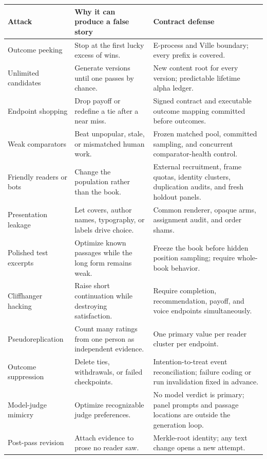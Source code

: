 \documentclass[11pt]{article}
\theoremstyle{remark}
\begin{document}
\begin{center}
\footnotesize
\begin{tabular}{p{}p{}p{}}
\toprule
Attack & Why it can produce a false story & Contract defense \\
\midrule
Outcome peeking & Stop at the first lucky excess of wins. & E-process and Ville boundary;
every prefix is covered. \\
Unlimited candidates & Generate versions until one passes by chance. & New content root for
every version; predictable lifetime alpha ledger. \\
Endpoint shopping & Drop payoff or redefine a tie after a near miss. & Signed contract and
executable outcome mapping committed before outcomes. \\
Weak comparators & Beat unpopular, stale, or mismatched human work. & Frozen matched pool,
committed sampling, and concurrent comparator-health control. \\
Friendly readers or bots & Change the population rather than the book. & External recruitment,
frame quotas, identity clusters, duplication audits, and fresh holdout panels. \\
Presentation leakage & Let covers, author names, typography, or labels drive choice. & Common
renderer, opaque arms, assignment audit, and order shams. \\
Polished test excerpts & Optimize known passages while the long form remains weak. & Freeze the
book before hidden position sampling; require whole-book behavior. \\
Cliffhanger hacking & Raise short continuation while destroying satisfaction. & Require
completion, recommendation, payoff, and voice endpoints simultaneously. \\
Pseudoreplication & Count many ratings from one person as independent evidence. & One primary
value per reader cluster per endpoint. \\
Outcome suppression & Delete ties, withdrawals, or failed checkpoints. & Intention-to-treat
event reconciliation; failure coding or run invalidation fixed in advance. \\
Model-judge mimicry & Optimize recognizable judge preferences. & No model verdict is primary;
panel prompts and passage locations are outside the generation loop. \\
Post-pass revision & Attach evidence to prose no reader saw. & Merkle-root identity; any text
change opens a new attempt. \\
\bottomrule
\end{tabular}
\end{center}
\end{document}
